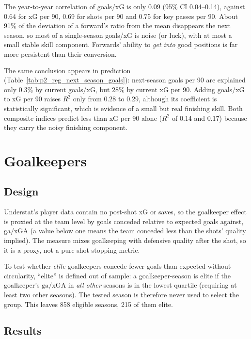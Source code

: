 \documentclass[11pt,a4paper]{article}
\begin{document}
The year-to-year correlation of goals/xG is only 0.09 (95\% CI 0.04--0.14), against 0.64 for xG per 90, 0.69 for shots per 90 and 0.75 for key passes per 90. About 91\% of the deviation of a forward's ratio from the mean disappears the next season, so most of a single-season goals/xG is noise (or luck), with at most a small stable skill component. Forwards' ability to \emph{get into} good positions is far more persistent than their conversion.

The same conclusion appears in prediction (Table~\ref{tab:p2_reg_next_season_goals}): next-season goals per 90 are explained only 0.3\% by current goals/xG, but 28\% by current xG per 90. Adding goals/xG to xG per 90 raises $R^2$ only from 0.28 to 0.29, although its coefficient is statistically significant, which is evidence of a small but real finishing skill. Both composite indices predict less than xG per 90 alone ($R^2$ of 0.14 and 0.17) because they carry the noisy finishing component.




\section{Goalkeepers}

\subsection{Design}

Understat's player data contain no post-shot xG or saves, so the goalkeeper effect is proxied at the team level by goals conceded relative to expected goals against, $\text{ga}/\text{xGA}$ (a value below one means the team conceded less than the shots' quality implied). The measure mixes goalkeeping with defensive quality after the shot, so it is a proxy, not a pure shot-stopping metric.

To test whether \emph{elite} goalkeepers concede fewer goals than expected without circularity, ``elite'' is defined out of sample: a goalkeeper-season is elite if the goalkeeper's $\text{ga}/\text{xGA}$ in \emph{all other} seasons is in the lowest quartile (requiring at least two other seasons). The tested season is therefore never used to select the group. This leaves 858 eligible seasons, 215 of them elite.

\subsection{Results}
\end{document}
